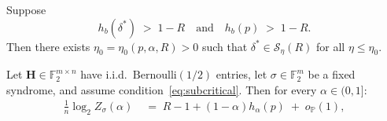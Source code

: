 \documentclass[10pt,a4paper]{amsart}
\newcommand{\Fb}{\mathbb{F}}
\newcommand{\Hb}{h_b}
\newcommand{\Hm}{\mathbf{H}}
\newcommand{\Pb}{\mathbb{P}}
\newcommand{\Seta}{\mathcal{S}}
\begin{document}
\begin{lemma}
\label{lem:delta_star_in_S}
Suppose
\begin{equation}
    \Hb(\delta^*) \;>\; 1-R
    \quad\text{and}\quad
    \Hb(p) \;>\; 1-R.
    \label{eq:subcritical}
\end{equation}
Then there exists $\eta_0=\eta_0(p,\alpha,R)>0$ such that
$\delta^*\in\Seta_\eta(R)$ for all $\eta\le\eta_0$.
\end{lemma}

\begin{theorem}
\label{thm:pf_exp}
Let $\Hm \in\Fb_2^{m\times n}$ have i.i.d.\ $\mathrm{Bernoulli}(1/2)$
entries, let $\sigma\in\Fb_2^m$ be a fixed syndrome, and assume
condition~\eqref{eq:subcritical}.
Then for every $\alpha\in(0,1]$:
\begin{align}
    \frac{1}{n}\log_2 Z_\sigma(\alpha)
    &\;=\;
    R-1+(1-\alpha)h_\alpha(p)\;+\;o_{\Pb}(1),
    \label{eq:pf_exp_alpha}
\end{align}

\end{theorem}
\end{document}
